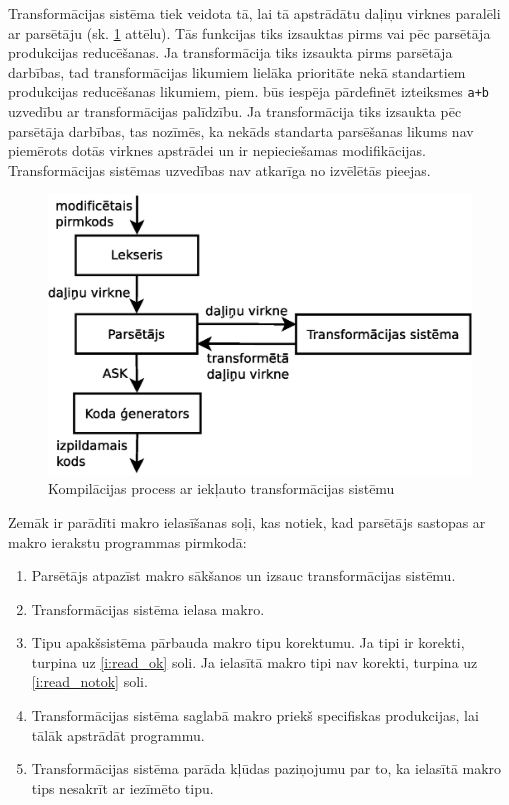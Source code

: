 Transformācijas sistēma tiek veidota tā, lai tā apstrādātu daļiņu virknes paralēli ar parsētāju (sk. \ref{fig:ransform_compiling} attēlu). Tās funkcijas tiks izsauktas pirms vai pēc parsētāja produkcijas reducēšanas. Ja transformācija tiks izsaukta pirms parsētāja darbības, tad transformācijas likumiem lielāka prioritāte nekā standartiem produkcijas reducēšanas likumiem, piem. būs iespēja pārdefinēt izteiksmes \verb|a+b| uzvedību ar transformācijas palīdzību. Ja transformācija tiks izsaukta pēc parsētāja darbības, tas nozīmēs, ka nekāds standarta parsēšanas likums nav piemērots dotās virknes apstrādei un ir nepieciešamas modifikācijas. Transformācijas sistēmas uzvedības nav atkarīga no izvēlētās pieejas.

\begin{figure}[H]
  \centering
    \includegraphics[scale=0.4]{pictures/transform_compiling}
  \caption{\label{fig:ransform_compiling}Kompilācijas process ar iekļauto transformācijas sistēmu}
\end{figure}

Zemāk ir parādīti makro ielasīšanas soļi, kas notiek, kad parsētājs sastopas ar makro ierakstu programmas pirmkodā:
\begin{enumerate}
\item
Parsētājs atpazīst makro sākšanos un izsauc transformācijas sistēmu.
\item
Transformācijas sistēma ielasa makro.
\item
Tipu apakšsistēma pārbauda makro tipu korektumu. Ja tipi ir korekti, turpina uz \ref{i:read_ok} soli. Ja ielasītā makro tipi nav korekti, turpina uz \ref{i:read_notok} soli.
\item \label{i:read_ok}
Transformācijas sistēma saglabā makro priekš specifiskas produkcijas, lai tālāk apstrādāt programmu.
\item \label{i:read_notok}
Transformācijas sistēma parāda kļūdas paziņojumu par to, ka ielasītā makro tips nesakrīt ar iezīmēto tipu.
\end{enumerate}

